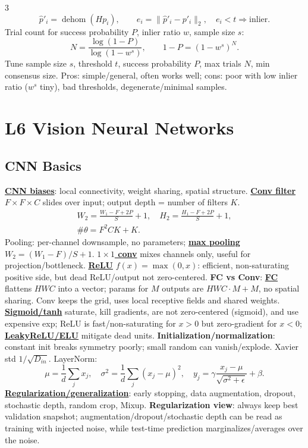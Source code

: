 \documentclass{article}
\numberwithin{equation}{subsection}
\newcommand{\key}[1]{\textbf{#1}}
\newcommand{\lowterm}[1]{\textbf{\underline{#1}}}
\begin{document}
\begin{multicols*}{3}
\[
\hat p'_i=\operatorname{dehom}(Hp_i),\qquad e_i=\|\hat p'_i-p'_i\|_2,\quad e_i<t\Rightarrow\text{inlier}.
\]
Trial count for success probability $P$, inlier ratio $w$, sample size $s$:
\[
N=\frac{\log(1-P)}{\log(1-w^s)},\qquad 1-P=(1-w^s)^N .
\]
Tune sample size $s$, threshold $t$, success probability $P$, max trials $N$, min consensus size. Pros: simple/general, often works well; cons: poor with low inlier ratio ($w^s$ tiny), bad thresholds, degenerate/minimal samples.

\section{L6 Vision Neural Networks}
\subsection{CNN Basics}
\lowterm{CNN biases}: local connectivity, weight sharing, spatial structure. \lowterm{Conv filter} $F\times F\times C$ slides over input; output depth = number of filters $K$.
\[
\begin{gathered}
W_2=\frac{W_1-F+2P}{S}+1,\quad
H_2=\frac{H_1-F+2P}{S}+1,\\
\#\theta=F^2CK+K.
\end{gathered}
\]
Pooling: per-channel downsample, no parameters; \lowterm{max pooling} $W_2=(W_1-F)/S+1$. \lowterm{$1\times1$ conv} mixes channels only, useful for projection/bottleneck. \lowterm{ReLU} $f(x)=\max(0,x)$: efficient, non-saturating positive side, but dead ReLU/output not zero-centered.
\key{FC vs Conv}: \lowterm{FC} flattens $HWC$ into a vector; params for $M$ outputs are $HWC\cdot M+M$, no spatial sharing. Conv keeps the grid, uses local receptive fields and shared weights. \lowterm{Sigmoid/tanh} saturate, kill gradients, are not zero-centered (sigmoid), and use expensive exp; ReLU is fast/non-saturating for $x>0$ but zero-gradient for $x<0$; \lowterm{LeakyReLU/ELU} mitigate dead units.
\key{Initialization/normalization}: constant init breaks symmetry poorly; small random can vanish/explode. Xavier std $1/\sqrt{D_{in}}$. LayerNorm:
\[
\mu=\frac1d\sum_jx_j,\quad \sigma^2=\frac1d\sum_j(x_j-\mu)^2,\quad y_j=\gamma\frac{x_j-\mu}{\sqrt{\sigma^2+\epsilon}}+\beta.
\]
\lowterm{Regularization/generalization}: early stopping, data augmentation, dropout, stochastic depth, random crop, Mixup. \key{Regularization view}: always keep best validation snapshot; augmentation/dropout/stochastic depth can be read as training with injected noise, while test-time prediction marginalizes/averages over the noise.


\end{multicols*}
\end{document}
